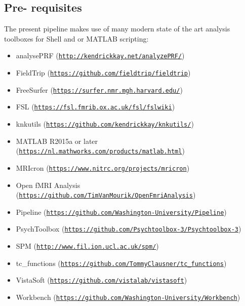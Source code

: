 \documentclass[12pt,a4paper]{scrartcl}
\begin{document}
\subsection{Pre- requisites}
\label{sec:prereq}
The present pipeline makes use of many modern state of the art analysis toolboxes for Shell and or MATLAB scripting:
\begin{itemize}
\item analysePRF (\href{http://kendrickkay.net/analyzePRF/}{\nolinkurl{http://kendrickkay.net/analyzePRF/}})
\item FieldTrip (\href{https://github.com/fieldtrip/fieldtrip}{\nolinkurl{https://github.com/fieldtrip/fieldtrip}})
\item FreeSurfer (\href{https://surfer.nmr.mgh.harvard.edu/}{\nolinkurl{https://surfer.nmr.mgh.harvard.edu/}})
\item FSL (\href{https://fsl.fmrib.ox.ac.uk/fsl/fslwiki}{\nolinkurl{https://fsl.fmrib.ox.ac.uk/fsl/fslwiki}})
\item knkutils (\href {https://github.com/kendrickkay/knkutils/}{\nolinkurl{https://github.com/kendrickkay/knkutils/}})
\item MATLAB R2015a or later (\href{https://nl.mathworks.com/products/matlab.html}{\nolinkurl{https://nl.mathworks.com/products/matlab.html}})
\item MRIcron (\href{https://www.nitrc.org/projects/mricron}{\nolinkurl{https://www.nitrc.org/projects/mricron}})
\item Open fMRI Analysis (\href{https://github.com/TimVanMourik/OpenFmriAnalysis}{\nolinkurl{https://github.com/TimVanMourik/OpenFmriAnalysis}})
\item Pipeline (\href{https://github.com/Washington-University/Pipeline}{\nolinkurl{https://github.com/Washington-University/Pipeline}})
\item PsychToolbox (\href{https://github.com/Psychtoolbox-3/Psychtoolbox-3}{\nolinkurl{https://github.com/Psychtoolbox-3/Psychtoolbox-3}})
\item SPM (\href{http://www.fil.ion.ucl.ac.uk/spm/}{\nolinkurl{http://www.fil.ion.ucl.ac.uk/spm/}})
\item tc\_functions  (\href{https://github.com/TommyClausner/tc\_functions}{\nolinkurl{https://github.com/TommyClausner/tc\_functions}})
\item VistaSoft (\href{https://github.com/vistalab/vistasoft}{\nolinkurl{https://github.com/vistalab/vistasoft}})
\item Workbench (\href{https://github.com/Washington-University/Workbench}{\nolinkurl{https://github.com/Washington-University/Workbench}})
\end{itemize}
\end{document}
